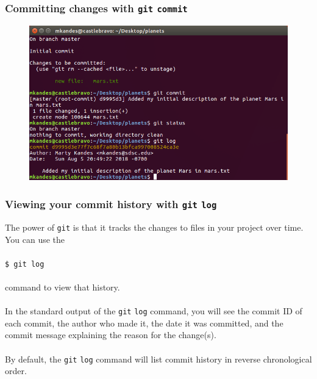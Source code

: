 \documentclass{beamer}
\begin{document}
\begin{frame}
   \frametitle{Committing changes with \texttt{git} \texttt{commit}}
   \begin{figure}[htbp]
      \includegraphics[width=1.0\textwidth]{images/git-after-commit.png}
   \end{figure}
\end{frame}

\begin{frame}
   \frametitle{Viewing your commit history with \texttt{git} \texttt{log}}
   The power of \texttt{git} is that it tracks the changes to files in 
   your project over time. You can use the
   \\ \ \\
   \texttt{\hspace{1.0em}\$ git log}
   \\ \ \\
   command to view that history.
   \\ \ \\
   In the standard output of the \texttt{git} \texttt{log} command, you
   will see the commit ID of each commit, the author who made it, the 
   date it was committed, and the commit message explaining the reason 
   for the change(s).
   \\ \ \\
   By default, the \texttt{git} \texttt{log} command will list commit 
   history in reverse chronological order. 
\end{frame}
\end{document}
